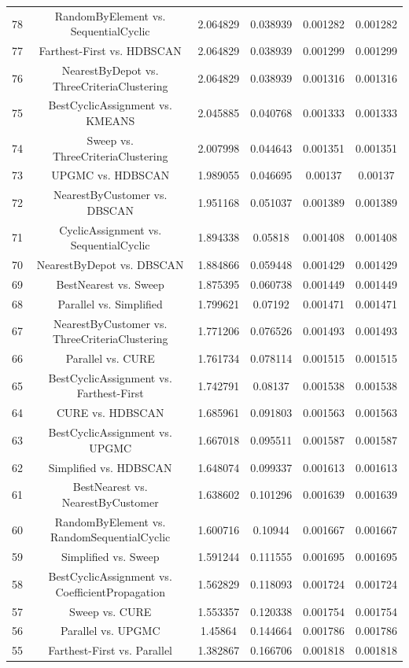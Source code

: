 \documentclass[a4paper,10pt]{article}
\begin{document}
\begin{landscape}
\begin{table}[!htp]
\begin{tabular}{cccccc}
78&RandomByElement vs. SequentialCyclic&2.064829&0.038939&0.001282&0.001282\\
77&Farthest-First vs. HDBSCAN&2.064829&0.038939&0.001299&0.001299\\
76&NearestByDepot vs. ThreeCriteriaClustering&2.064829&0.038939&0.001316&0.001316\\
75&BestCyclicAssignment vs. KMEANS&2.045885&0.040768&0.001333&0.001333\\
74&Sweep vs. ThreeCriteriaClustering&2.007998&0.044643&0.001351&0.001351\\
73&UPGMC vs. HDBSCAN&1.989055&0.046695&0.00137&0.00137\\
72&NearestByCustomer vs. DBSCAN&1.951168&0.051037&0.001389&0.001389\\
71&CyclicAssignment vs. SequentialCyclic&1.894338&0.05818&0.001408&0.001408\\
70&NearestByDepot vs. DBSCAN&1.884866&0.059448&0.001429&0.001429\\
69&BestNearest vs. Sweep&1.875395&0.060738&0.001449&0.001449\\
68&Parallel vs. Simplified&1.799621&0.07192&0.001471&0.001471\\
67&NearestByCustomer vs. ThreeCriteriaClustering&1.771206&0.076526&0.001493&0.001493\\
66&Parallel vs. CURE&1.761734&0.078114&0.001515&0.001515\\
65&BestCyclicAssignment vs. Farthest-First&1.742791&0.08137&0.001538&0.001538\\
64&CURE vs. HDBSCAN&1.685961&0.091803&0.001563&0.001563\\
63&BestCyclicAssignment vs. UPGMC&1.667018&0.095511&0.001587&0.001587\\
62&Simplified vs. HDBSCAN&1.648074&0.099337&0.001613&0.001613\\
61&BestNearest vs. NearestByCustomer&1.638602&0.101296&0.001639&0.001639\\
60&RandomByElement vs. RandomSequentialCyclic&1.600716&0.10944&0.001667&0.001667\\
59&Simplified vs. Sweep&1.591244&0.111555&0.001695&0.001695\\
58&BestCyclicAssignment vs. CoefficientPropagation&1.562829&0.118093&0.001724&0.001724\\
57&Sweep vs. CURE&1.553357&0.120338&0.001754&0.001754\\
56&Parallel vs. UPGMC&1.45864&0.144664&0.001786&0.001786\\
55&Farthest-First vs. Parallel&1.382867&0.166706&0.001818&0.001818\\

\end{tabular}
\end{table}
\end{landscape}
\end{document}
